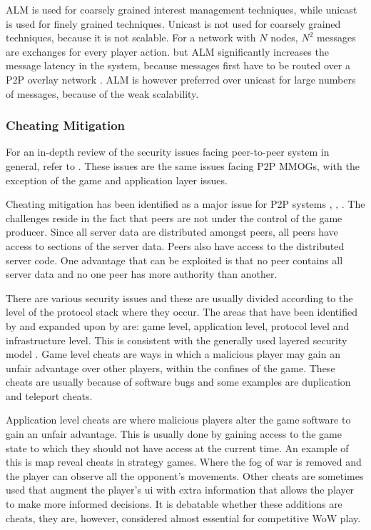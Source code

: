 \documentclass[journal,oneside,a4paper,onecolumn]{IEEEtran}
\begin{document}
ALM is used for coarsely grained interest management techniques, while unicast is used for finely grained techniques. Unicast is not used for coarsely grained techniques, because it is not scalable. For a network with $N$ nodes, $N^2$ messages are exchanges for every player action. but ALM significantly increases the message latency in the system, because messages first have to be routed over a P2P overlay network \cite{}. ALM is however preferred over unicast for large numbers of messages, because of the weak scalability.

\subsubsection{Cheating Mitigation}


For an in-depth review of the security issues facing peer-to-peer system in general, refer to \cite{p2p_security_issues}. These issues are the same issues facing P2P MMOGs, with the exception of the game and application layer issues. %

Cheating mitigation has been identified as a major issue for P2P systems \cite{knutsson_p2p_first}, \cite{challenges_p2p_gaming}, \cite{lock_step_NEO}. The challenges reside in the fact that peers are not under the control of the game producer. Since all server data are distributed amongst peers, all peers have access to sections of the server data. Peers also have access to the distributed server code. One advantage that can be exploited is that no peer contains all server data and no one peer has more authority than another.

There are various security issues and these are usually divided according to the level of the protocol stack where they occur. The areas that have been identified by \cite{cheat_proof_event_ordering} and expanded upon by \cite{cheating_taxonomy} are: game level, application level, protocol level and infrastructure level. This is consistent with the generally used layered security model \cite{distributed_systems_security}. Game level cheats are ways in which a malicious player may gain an unfair advantage over other players, within the confines of the game. These cheats are usually because of software bugs and some examples are duplication and teleport cheats.

Application level cheats are where malicious players alter the game software to gain an unfair advantage. This is usually done by gaining access to the game state to which they should not have access at the current time. An example of this is map reveal cheats in strategy games. Where the fog of war is removed and the player can observe all the opponent's movements. Other cheats are sometimes used that augment the player's \ac{ui} with extra information that allows the player to make more informed decisions. It is debatable whether these additions are cheats, they are, however, considered almost essential for competitive \ac{WoW} play.
\end{document}
